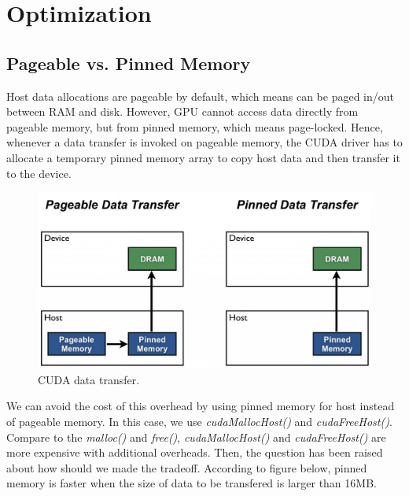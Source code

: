 \documentclass[journal,12pt,onecolumn,draftclsnofoot]{ieeeconf}  %
\begin{document}
\section{Optimization}

\subsection{Pageable vs. Pinned Memory}
Host data allocations are pageable by default, which means can be paged in/out between RAM and disk. However, GPU cannot access data directly from pageable memory, but from pinned memory, which means page-locked. Hence, whenever a data transfer is invoked on pageable memory, the CUDA driver has to allocate a temporary pinned memory array to copy host data and then transfer it to the device. \par
\begin{figure}[h]
	\centering\includegraphics[width=120mm]{pinned.jpg}
	\caption{CUDA data transfer.\cite{Mark}}
	\label{CUDA data transfer.}
\end{figure}
We can avoid the cost of this overhead by using pinned memory for host instead of pageable memory. In this case, we use \textit{cudaMallocHost()} and \textit{cudaFreeHost()}. Compare to the \textit{malloc()} and \textit{free()}, \textit{cudaMallocHost()} and \textit{cudaFreeHost()} are more expensive with additional overheads. Then, the question has been raised about how should we made the tradeoff. According to figure below, pinned memory is faster when the size of data to be transfered is larger than 16MB.  	\cite{Trade_off}\par
\end{document}
